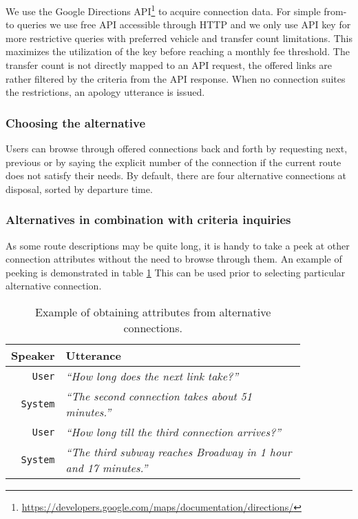 We use the Google Directions API\footnote{\url{https://developers.google.com/maps/documentation/directions/}} to acquire connection data.
For simple from-to queries we use free API accessible through HTTP and we only use API key for more restrictive queries with preferred vehicle and transfer count limitations.
This maximizes the utilization of the key before reaching a monthly fee threshold. 
The transfer count is not directly mapped to an API request, the offered links are rather filtered by the criteria from the API response.
When no connection suites the restrictions, an apology utterance is issued.

\subsubsection{Choosing the alternative}

Users can browse through offered connections back and forth by requesting next, previous or by saying the explicit number of the connection if the current route does not satisfy their needs.
By default, there are four alternative connections at disposal, sorted by departure time.


\subsubsection{Alternatives in combination with criteria inquiries}

As some route descriptions may be quite long, it is handy to take a peek at other connection attributes without the need to browse through them. An example of peeking is demonstrated in table \ref{table:peek}
This can be used prior to selecting particular alternative connection.

\begin{table}[h]
\centering
\begin{tabular}{ | r | p{0.85\linewidth} | } \hline
	Speaker & Utterance \\ \hline
	\texttt{User} & \textit{``How long does the next link take?''} \\ \hline
	\texttt{System} & \textit{``The second connection takes about 51 minutes.''} \\ \hline
	\texttt{User} & \textit{``How long till the third connection arrives?''} \\ \hline
	\texttt{System} & \textit{``The third subway reaches Broadway in 1 hour and 17 minutes.''} \\ \hline
\end{tabular}
\caption[Alternative attribute peek]{Example of obtaining attributes from alternative connections.}
\label{table:peek}
\end{table}


